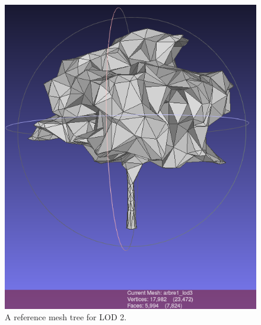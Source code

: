 \documentclass[12pt]{article}
\begin{document}
\begin{figure}[H]
    \centering
    \begin{minipage}{0.45\textwidth}
        \centering
        \includegraphics[width=\textwidth]{images/lod2.png}
        \caption{A reference mesh tree for LOD 2.}
    \end{minipage}\hfill
    \begin{minipage}{0.45\textwidth}
        \centering

\end{minipage}
\end{figure}
\end{document}
